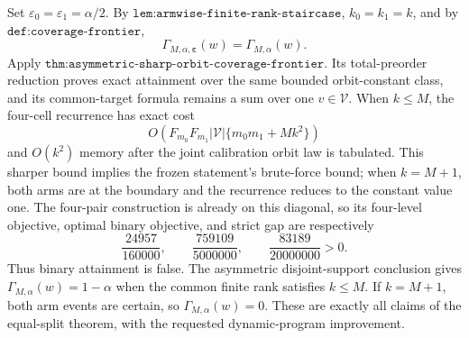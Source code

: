 Set \(\varepsilon_0=\varepsilon_1=\alpha/2\). By \(\texttt{lem:armwise-finite-rank-staircase}\), \(k_0=k_1=k\), and by \(\texttt{def:coverage-frontier}\),
\[
\Gamma_{M,\alpha,\boldsymbol\varepsilon}(w)=\Gamma_{M,\alpha}(w).
\]
Apply \(\texttt{thm:asymmetric-sharp-orbit-coverage-frontier}\). Its total-preorder reduction proves exact attainment over the same bounded orbit-constant class, and its common-target formula remains a sum over one \(v\in\mathcal V\). When \(k\le M\), the four-cell recurrence has exact cost
\[
O\!\left(F_{m_0}F_{m_1}|\mathcal V|\{m_0m_1+Mk^2\}\right)
\]
and \(O(k^2)\) memory after the joint calibration orbit law is tabulated. This sharper bound implies the frozen statement's brute-force bound; when \(k=M+1\), both arms are at the boundary and the recurrence reduces to the constant value one. The four-pair construction is already on this diagonal, so its four-level objective, optimal binary objective, and strict gap are respectively
\[
\frac{24957}{160000},\qquad \frac{759109}{5000000},\qquad \frac{83189}{20000000}>0.
\]
Thus binary attainment is false. The asymmetric disjoint-support conclusion gives \(\Gamma_{M,\alpha}(w)=1-\alpha\) when the common finite rank satisfies \(k\le M\). If \(k=M+1\), both arm events are certain, so \(\Gamma_{M,\alpha}(w)=0\). These are exactly all claims of the equal-split theorem, with the requested dynamic-program improvement.